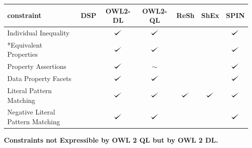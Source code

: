\documentclass{llncs}
\def\checkmark{\tikz\fill[scale=0.4](0,.35) -- (.25,0) -- (1,.7) -- (.25,.15) -- cycle;}
\newenvironment{evaluation}{
  \scriptsize
  \sffamily
  \vspace{0.3cm}
  \begin{tabular}{l|c|c|c|c|c|c}
  \hline
  \textbf{constraint} & \textbf{DSP} & \textbf{OWL2-DL} & \textbf{OWL2-QL} & \textbf{ReSh} & \textbf{ShEx} & \textbf{SPIN} \\
  \hline

}{
  \hline
  \end{tabular}
  \linebreak
}
\begin{document}
\begin{evaluation}
Individual Inequality & \ding{55} & $\checkmark$ & $\checkmark$ & \ding{55} & \ding{55} & $\checkmark$ \\
*Equivalent Properties & \ding{55} & $\checkmark$ & $\checkmark$ & \ding{55} & \ding{55} & $\checkmark$ \\
Property Assertions & \ding{55} & $\checkmark$ & $\sim$ & \ding{55} & \ding{55} & $\checkmark$ \\
Data Property Facets & \ding{55} & $\checkmark$ & $\checkmark$ & \ding{55} & \ding{55} & $\checkmark$ \\
Literal Pattern Matching & \ding{55} & $\checkmark$ & $\checkmark$ & $\checkmark$ & $\checkmark$ & $\checkmark$ \\
Negative Literal Pattern Matching & \ding{55} & $\checkmark$ & $\checkmark$ & & & $\checkmark$ \\
\end{evaluation}

\textbf{Constraints not Expressible by OWL 2 QL but by OWL 2 DL.}
\end{document}
